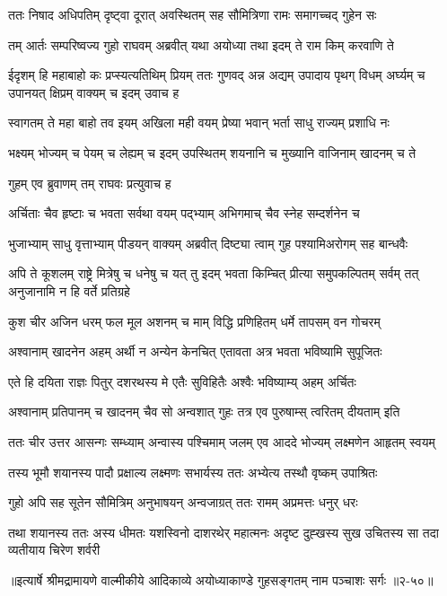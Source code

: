 \twolineshloka
{ततः निषाद अधिपतिम् दृष्ट्वा दूरात् अवस्थितम्}
{सह सौमित्रिणा रामः समागच्चद् गुहेन सः} %

\twolineshloka
{तम् आर्तः सम्परिष्वज्य गुहो राघवम् अब्रवीत्}
{यथा अयोध्या तथा इदम् ते राम किम् करवाणि ते} %

\threelineshloka
{ईदृशम् हि महाबाहो कः प्रप्स्यत्यतिथिम् प्रियम्}
{ततः गुणवद् अन्न अद्यम् उपादाय पृथग् विधम्}
{अर्घ्यम् च उपानयत् क्षिप्रम् वाक्यम् च इदम् उवाच ह} %

\twolineshloka
{स्वागतम् ते महा बाहो तव इयम् अखिला मही}
{वयम् प्रेष्या भवान् भर्ता साधु राज्यम् प्रशाधि नः} %

\twolineshloka
{भक्ष्यम् भोज्यम् च पेयम् च लेह्यम् च इदम् उपस्थितम्}
{शयनानि च मुख्यानि वाजिनाम् खादनम् च ते} %

\onelineshloka
{गुहम् एव ब्रुवाणम् तम् राघवः प्रत्युवाच ह} %

\twolineshloka
{अर्चिताः चैव हृष्टाः च भवता सर्वथा वयम्}
{पद्भ्याम् अभिगमाच् चैव स्नेह सम्दर्शनेन च} %

\twolineshloka
{भुजाभ्याम् साधु वृत्ताभ्याम् पीडयन् वाक्यम् अब्रवीत्}
{दिष्ट्या त्वाम् गुह पश्यामिअरोगम् सह बान्धवैः} %

\threelineshloka
{अपि ते कूशलम् राष्ट्रे मित्रेषु च धनेषु च}
{यत् तु इदम् भवता किम्चित् प्रीत्या समुपकल्पितम्}
{सर्वम् तत् अनुजानामि न हि वर्ते प्रतिग्रहे} %

\twolineshloka
{कुश चीर अजिन धरम् फल मूल अशनम् च माम्}
{विद्धि प्रणिहितम् धर्मे तापसम् वन गोचरम्} %

\twolineshloka
{अश्वानाम् खादनेन अहम् अर्थी न अन्येन केनचित्}
{एतावता अत्र भवता भविष्यामि सुपूजितः} %

\twolineshloka
{एते हि दयिता राज्ञः पितुर् दशरथस्य मे}
{एतैः सुविहितैः अश्वैः भविष्याम्य् अहम् अर्चितः} %

\twolineshloka
{अश्वानाम् प्रतिपानम् च खादनम् चैव सो अन्वशात्}
{गुहः तत्र एव पुरुषाम्स् त्वरितम् दीयताम् इति} %

\twolineshloka
{ततः चीर उत्तर आसन्गः सम्ध्याम् अन्वास्य पश्चिमाम्}
{जलम् एव आददे भोज्यम् लक्ष्मणेन आहृतम् स्वयम्} %

\twolineshloka
{तस्य भूमौ शयानस्य पादौ प्रक्षाल्य लक्ष्मणः}
{सभार्यस्य ततः अभ्येत्य तस्थौ वृष्कम् उपाश्रितः} %

\twolineshloka
{गुहो अपि सह सूतेन सौमित्रिम् अनुभाषयन्}
{अन्वजाग्रत् ततः रामम् अप्रमत्तः धनुर् धरः} %

\fourlineindentedshloka
{तथा शयानस्य ततः अस्य धीमतः}
{यशस्विनो दाशरथेर् महात्मनः}
{अदृष्ट दुह्खस्य सुख उचितस्य सा}
{तदा व्यतीयाय चिरेण शर्वरी} %


॥इत्यार्षे श्रीमद्रामायणे वाल्मीकीये आदिकाव्ये अयोध्याकाण्डे गुहसङ्गतम् नाम पञ्चाशः सर्गः ॥२-५०॥
